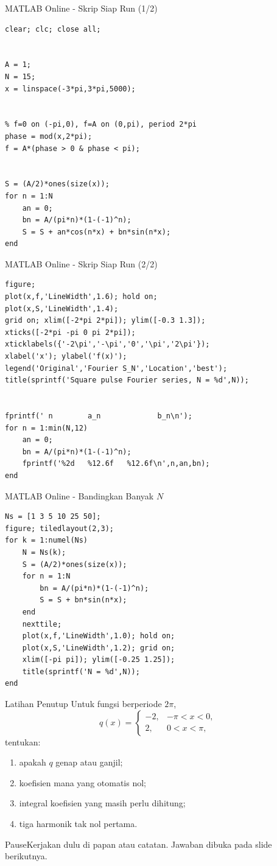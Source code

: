 \documentclass[aspectratio=169,10pt]{beamer}
\newcommand{\pauseboard}{\begin{alertblock}{Pause}Kerjakan dulu di papan atau catatan. Jawaban dibuka pada slide berikutnya.\end{alertblock}}
\begin{document}
\begin{frame}[fragile]{MATLAB Online - Skrip Siap Run (1/2)}
\begin{lstlisting}[style=matlab]
%% Fourier series: periodic square pulse
clear; clc; close all;


A = 1;
N = 15;
x = linspace(-3*pi,3*pi,5000);


% f=0 on (-pi,0), f=A on (0,pi), period 2*pi
phase = mod(x,2*pi);
f = A*(phase > 0 & phase < pi);


S = (A/2)*ones(size(x));
for n = 1:N
    an = 0;
    bn = A/(pi*n)*(1-(-1)^n);
    S = S + an*cos(n*x) + bn*sin(n*x);
end
\end{lstlisting}
\end{frame}


\begin{frame}[fragile]{MATLAB Online - Skrip Siap Run (2/2)}
\begin{lstlisting}[style=matlab]
figure;
plot(x,f,'LineWidth',1.6); hold on;
plot(x,S,'LineWidth',1.4);
grid on; xlim([-2*pi 2*pi]); ylim([-0.3 1.3]);
xticks([-2*pi -pi 0 pi 2*pi]);
xticklabels({'-2\pi','-\pi','0','\pi','2\pi'});
xlabel('x'); ylabel('f(x)');
legend('Original','Fourier S_N','Location','best');
title(sprintf('Square pulse Fourier series, N = %d',N));


fprintf(' n        a_n             b_n\n');
for n = 1:min(N,12)
    an = 0;
    bn = A/(pi*n)*(1-(-1)^n);
    fprintf('%2d   %12.6f   %12.6f\n',n,an,bn);
end
\end{lstlisting}
\end{frame}


\begin{frame}[fragile]{MATLAB Online - Bandingkan Banyak $N$}
\begin{lstlisting}[style=matlab]
Ns = [1 3 5 10 25 50];
figure; tiledlayout(2,3);
for k = 1:numel(Ns)
    N = Ns(k);
    S = (A/2)*ones(size(x));
    for n = 1:N
        bn = A/(pi*n)*(1-(-1)^n);
        S = S + bn*sin(n*x);
    end
    nexttile;
    plot(x,f,'LineWidth',1.0); hold on;
    plot(x,S,'LineWidth',1.2); grid on;
    xlim([-pi pi]); ylim([-0.25 1.25]);
    title(sprintf('N = %d',N));
end
\end{lstlisting}
\end{frame}


\begin{frame}{Latihan Penutup}
Untuk fungsi berperiode $2\pi$,
\[
q(x)=
\begin{cases}
-2,&-\pi<x<0,\\
2,&0<x<\pi,
\end{cases}
\]
tentukan:
\begin{enumerate}
\item apakah $q$ genap atau ganjil;
\item koefisien mana yang otomatis nol;
\item integral koefisien yang masih perlu dihitung;
\item tiga harmonik tak nol pertama.
\end{enumerate}
\pauseboard
\end{frame}
\end{document}
